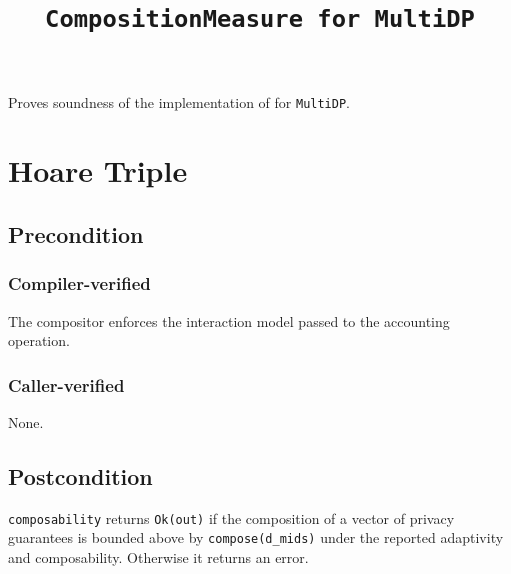 \documentclass{article}
\title{\texttt{CompositionMeasure for MultiDP}}
\author{\MichaelShoemateAuthor}
\date{}
\begin{document}
\maketitle

\contrib
Proves soundness of the implementation of  for \texttt{MultiDP}.

\section{Hoare Triple}
\subsection*{Precondition}
\subsubsection*{Compiler-verified}
The compositor enforces the interaction model passed to the accounting operation.

\subsubsection*{Caller-verified}
None.

\subsection*{Postcondition}
\begin{theorem}
\texttt{composability} returns \texttt{Ok(out)} if the composition of a vector of
privacy guarantees is bounded above by \texttt{compose(d\_mids)} under the
reported adaptivity and composability. Otherwise it returns an error.
\end{theorem}
\end{document}
